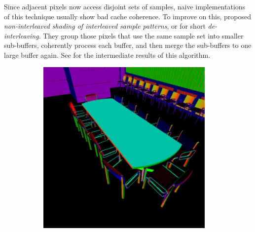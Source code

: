  Since adjacent pixels now access disjoint sets of samples, naive implementations of this technique usually show bad cache coherence. To improve on this, \citet{segovia2006non} proposed \textit{non-interleaved shading of interleaved sample patterns}, or for short \textit{de-interleaving}. They group those pixels that use the same sample set into smaller sub-buffers, coherently process each buffer, and then merge the sub-buffers to one large buffer again. See  for the intermediate results of this algorithm.


 \begin{figure}[htb]
     \centering
     \begin{subfigure}[b]{0.33\textwidth}
         \centering
         \includegraphics[width=0.95\textwidth]{graphics/interleaved_segovia_1}
         \caption{}
         \label{fig:concept:interleaved_segovia_1}
         \end{subfigure}%
         \begin{subfigure}[b]{0.33\textwidth}
             \centering

\end{subfigure}
\end{figure}
